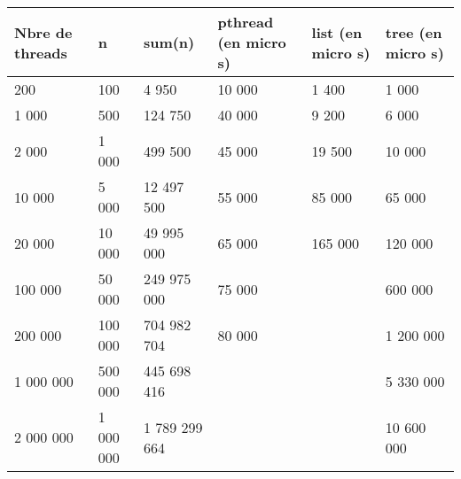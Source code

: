 \usepackage{array}
\begin{tabular}{|l|l|l|l|l|l|}
  \hline
  Nbre de threads & n & sum(n)  & pthread (en micro s) & list (en micro s) & tree (en micro s)\\
  \hline
  200       & 100       & 4 950         &  10 000 & 1 400   & 1 000      \\
  1 000     & 500       & 124 750       &  40 000 & 9 200   & 6 000      \\
  2 000     & 1 000     & 499 500       &  45 000 & 19 500  & 10 000     \\
  10 000    & 5 000     & 12 497 500    &  55 000 & 85 000  & 65 000     \\
  20 000    & 10 000    & 49 995 000    &  65 000 & 165 000 & 120 000    \\
  100 000   & 50 000    & 249 975 000   &  75 000 &         & 600 000    \\
  200 000   & 100 000   & 704 982 704   &  80 000 &         & 1 200 000  \\
  1 000 000 & 500 000   & 445 698 416   &         &         & 5 330 000  \\
  2 000 000 & 1 000 000 & 1 789 299 664 &         &         & 10 600 000 \\
\hline
\end{tabular}
